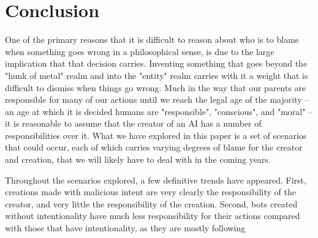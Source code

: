 \documentclass[12]{article}
\begin{document}
\section{Conclusion}
	One of the primary reasons that it is difficult to reason about who is to blame when something goes wrong in a philosophical sense, is due to the large implication that that decision carries. Inventing something that goes beyond the "hunk of metal" realm and into the "entity" realm carries with it a weight that is difficult to dismiss when things go wrong. Much in the way that our parents are responsible for many of our actions until we reach the legal age of the majority -- an age at which it is decided humans are "responsible", "conscious", and "moral" -- it is reasonable to assume that the creator of an AI has a number of responsibilities over it. What we have explored in this paper is a set of scenarios that could occur, each of which carries varying degrees of blame for the creator and creation, that we will likely have to deal with in the coming years.
	
	Throughout the scenarios explored, a few definitive trends have appeared. First, creations made with malicious intent are very clearly the responsibility of the creator, and very little the responsibility of the creation. Second, bots created without intentionality have much less responsibility for their actions compared with those that have intentionality, as they are mostly following 

\newpage

\printbibliography[title={References}]
\end{document}
